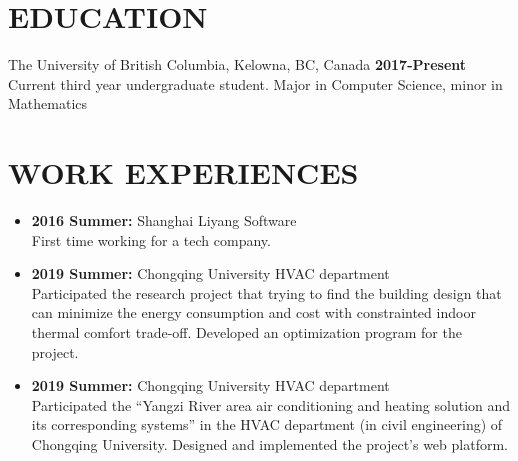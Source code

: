 \documentclass{res}
\begin{document}

\address{jimmy123good@hotmail.com \\ https://github.com/ailrk \\ https://ailrk.github.io/home \\ (250) 899 2600}
\begin{resume}

\section{EDUCATION}
The University of British Columbia, Kelowna, BC, Canada  \hspace{1.2in} \textbf{2017-Present}\\
    Current third year undergraduate student. Major in Computer Science, minor in Mathematics \\

\section{WORK EXPERIENCES}
\begin{itemize}[leftmargin=-.2in]
    \setlength\itemsep{-1em}
    \item \textbf{2016 Summer:} Shanghai Liyang Software
    \vspace{0.05in}\\
    First time working for a tech company. \\
    \item \textbf{2019 Summer:} Chongqing University HVAC department
        \vspace{0.05in}\\ Participated the research project that trying to find the building design that can minimize the energy consumption and cost with constrainted indoor thermal comfort trade-off. Developed an optimization program for the project. \\
    \item \textbf{2019 Summer:} Chongqing University HVAC department
    \vspace{0.05in}\\
    Participated the ``Yangzi River area air conditioning and heating solution and its corresponding systems'' in the HVAC department (in civil engineering) of Chongqing University.  Designed and implemented the project's web platform. \\


\end{itemize}
\end{resume}
\end{document}
